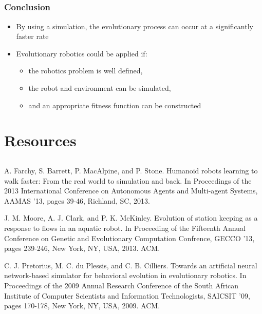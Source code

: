 \documentclass{beamer}
\begin{document}
\subsection{}
\begin{frame}
  \frametitle{Conclusion}
  \begin{itemize}
\item By using a simulation, the evolutionary process can occur at a significantly faster rate
\item Evolutionary robotics could be applied if:
 \begin{itemize}
\item the robotics problem is well defined,
\item the robot and environment can be simulated,
\item and an appropriate fitness function can be constructed
\end{itemize}
\end{itemize}
\end{frame}

\section*{Resources}
\subsection*{}
\begin{frame}
\begin{thebibliography}{lskdjf}
	
A. Farchy, S. Barrett, P. MacAlpine, and P. Stone.
\newblock Humanoid robots learning to walk faster: From the real world to simulation and back.
\newblock In Proceedings of the 2013 International Conference on Autonomous Agents and Multi-agent Systems, AAMAS '13, pages 39-46, Richland, SC, 2013.
	
	J. M. Moore, A. J. Clark, and P. K. McKinley.
\newblock Evolution of station keeping as a response to flows in an aquatic robot.
\newblock In Proceeding of the Fifteenth Annual Conference on Genetic and Evolutionary Computation Confrence, GECCO '13, pages 239-246, New York, NY, USA, 2013. ACM.
  
	C. J. Pretorius, M. C. du Plessis,  and C. B. Cilliers.
\newblock Towards an artificial neural network-based simulator for behavioral evolution in evolutionary robotics.
\newblock In Proceedings of the 2009 Annual Research Conference of the South African Institute of Computer Scientists and Information Technologists, SAICSIT '09, pages 170-178, New York, NY, USA, 2009. ACM.
  	\end{thebibliography}
\end{frame}
\end{document}
